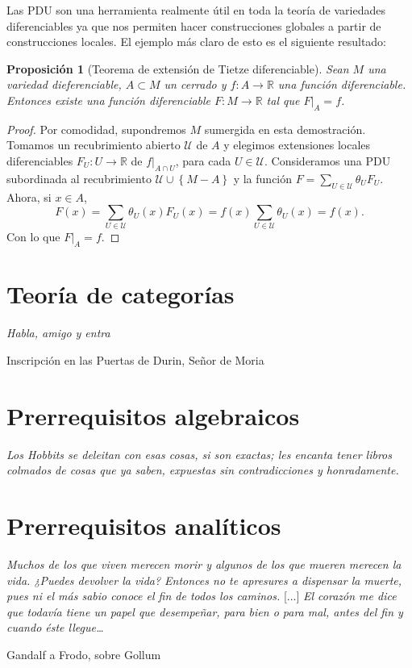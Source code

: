 \documentclass[12pt,a4paper]{book}
\newtheorem{prop}[thm]{Proposición}
\theoremstyle{definition} \newtheorem{defn}[thm]{Definición}
\theoremstyle{definition} \newtheorem{ejemplo}[thm]{Ejemplo}
\theoremstyle{definition} \newtheorem{ejercicio}[thm]{Ejercicio}
\theoremstyle{remark} \newtheorem*{obs}{Observación}
\def\RR{\mathbb{R}}
\begin{document}
Las PDU son una herramienta realmente útil en toda la teoría de variedades diferenciables ya que nos permiten hacer construcciones globales a partir de construcciones locales. El ejemplo más claro de esto es el siguiente resultado:

\begin{prop}[Teorema de extensión de Tietze diferenciable]
  Sean $M$ una variedad dieferenciable, $A\subset M$ un cerrado y $f:A\rightarrow \RR$ una función diferenciable. Entonces existe una función diferenciable $F: M\rightarrow \RR$ tal que $F|_A=f$.
\end{prop}

\begin{proof}
  Por comodidad, supondremos $M$ sumergida en esta demostración. Tomamos un recubrimiento abierto $\mathcal{U}$ de $A$ y elegimos extensiones locales diferenciables $F_U:U\rightarrow \RR$ de $f|_{A\cap U}$, para cada $U\in \mathcal{U}$. Consideramos una PDU subordinada al recubrimiento $\mathcal{U} \cup \left\{ M-A \right\}$ y la función $F=\sum_{U\in \mathcal{U}} \theta_U F_U$. Ahora, si $x\in A$,
  $$
    F(x)=\sum_{U\in \mathcal{U}} \theta_U(x) F_U(x)=f(x) \sum_{U\in \mathcal{U}} \theta_U(x) = f(x).
    $$
    Con lo que $F|_A = f$.
\end{proof}

\chapter{Teoría de categorías}
\epigraph{\textit{Habla, amigo y entra}}{Inscripción en las Puertas de Durin, Señor de Moria}
\chapter{Prerrequisitos algebraicos}
		      \epigraph{\textit{Los Hobbits se deleitan con esas cosas, si son exactas; les encanta tener libros colmados de cosas que ya saben, expuestas sin contradicciones y honradamente.}}{}
\chapter{Prerrequisitos analíticos}
\epigraph{\textit{Muchos de los que viven merecen morir y algunos de los que mueren merecen la vida. ¿Puedes devolver la vida? Entonces no te apresures a dispensar la muerte, pues ni el más sabio conoce el fin de todos los caminos.} [...] \textit{El corazón me dice que todavía tiene un papel que desempeñar, para bien o para mal, antes del fin y cuando éste llegue\dots}}{Gandalf a Frodo, sobre Gollum}
		      \newpage\null\thispagestyle{empty}
		      \tableofcontents
		      
\end{document}
